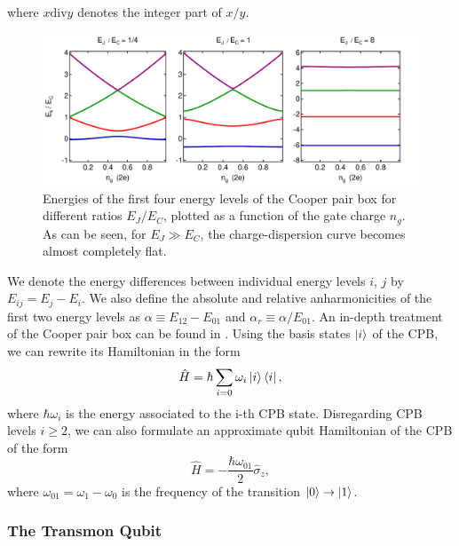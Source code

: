 %
where $x\mathrm{div}y$ denotes the integer part of $x/y$.
\begin{figure}[ht!]
	\includegraphics[width=\textwidth]{"./material/mathematica/cooper_pair_box_energies"}
	\caption{Energies of the first four energy levels of the Cooper pair box for different ratios $E_J/E_C$, plotted as a function of the gate charge $n_g$. As can be seen, for $E_J \gg E_C$, the charge-dispersion curve becomes almost completely flat.}
	\label{fig:CooperPairBoxEnergies}
\end{figure}

We denote the energy differences between individual energy levels $i$, $j$ by $E_{ij} = E_j - E_i$. We also define the absolute and relative anharmonicities of the first two energy levels as $\alpha \equiv E_{12}-E_{01}$ and $\alpha_r \equiv \alpha / E_{01}$. An in-depth treatment of the Cooper pair box can be found in \citep{cottet_implementation_2002}. Using the basis states $\left| i \right>$ of the CPB, we can rewrite its Hamiltonian in the form 
%
\begin{equation}
\hat{H} = \hbar\sum\limits_{i=0} \omega_i\left| i \right>\left< i \right|,
\end{equation}
%
where $\hbar\omega_i$ is the energy associated to the i-th CPB state. Disregarding CPB levels $i \ge 2$, we can also formulate an approximate qubit Hamiltonian of the CPB of the form
%
\begin{equation}
\hat{H} = -\frac{\hbar\omega_{01}}{2}\hat{\sigma}_z, \label{eq:cpb_qubit_hamiltonian}
\end{equation}
%
where $\omega_{01}=\omega_1-\omega_0$ is the frequency of the transition $\left| 0 \right>\to\left| 1 \right>$.

\subsubsection{The Transmon Qubit}

